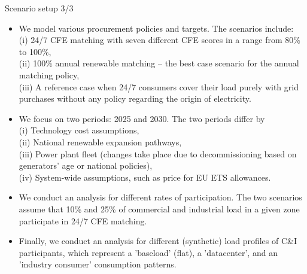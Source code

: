 \begin{frame}{Scenario setup 3/3}

  {\footnotesize 
  \begin{itemize}

  \item We model various procurement policies and targets. The scenarios include: \\
  (i) \alert{24/7 CFE matching} with seven different CFE scores in a range from 80\% to 100\%, \\
  (ii) \alert{100\% annual renewable matching} -- the best case scenario for the annual matching policy, \\
  (iii) \alert{A reference case} when 24/7 consumers cover their load purely with grid purchases 
  without any policy regarding the origin of electricity.

  \item We focus on two periods: \alert{2025} and \alert{2030}. The two periods differ by \\ 
  (i) Technology cost assumptions, \\
  (ii) National renewable expansion pathways,\\
  (iii) Power plant fleet (changes take place due to decommissioning based on generators' 
  age or national policies), \\
  (iv) System-wide assumptions, such as price for EU ETS allowances.

  \item We conduct an analysis for different rates of participation. The two scenarios 
  assume that \alert{10\%} and \alert{25\%} of commercial and industrial load
  in a given zone participate in 24/7 CFE matching.

  \item Finally, we conduct an analysis for different (synthetic) load profiles of C\&I participants, which
  represent a \alert{'baseload'} (flat), a \alert{'datacenter'}, and an \alert{'industry consumer'} consumption patterns.   

  \end{itemize}
  }
\end{frame}


